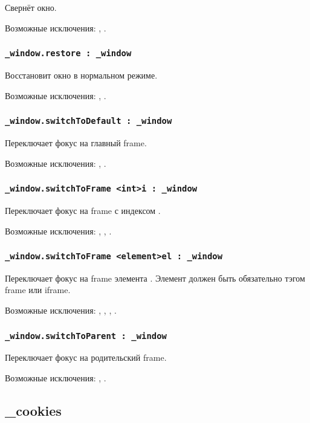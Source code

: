 Свернёт окно.

Возможные исключения: , .

\subsubsection{\lstinline|_window.restore : _window|}

Восстановит окно в нормальном режиме.

Возможные исключения: , .

\subsubsection{\lstinline|_window.switchToDefault : _window|}

Переключает фокус на главный frame.

Возможные исключения: , .

\subsubsection{\lstinline|_window.switchToFrame <int>i : _window|}

Переключает фокус на frame с индексом .

Возможные исключения: , , .

\subsubsection{\lstinline|_window.switchToFrame <element>el : _window|}

Переключает фокус на frame элемента . Элемент должен быть обязательно тэгом frame или iframe.

Возможные исключения: , , , .

\subsubsection{\lstinline|_window.switchToParent : _window|}

Переключает фокус на родительский frame.

Возможные исключения: , .

\subsection{{\color{orange} \_cookies}}

